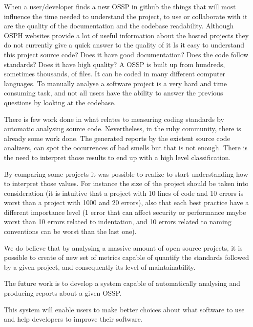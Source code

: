 \documentclass[sle]{llncs}
\begin{document}
When a user/developer finds a new OSSP in github 
the things that will most influence the time needed to understand the project, to use or collaborate with it
are the quality of the documentation and the codebase readability.  
Although OSPH websites provide a lot of useful information about the hosted projects
they do not currently give a quick answer to the quality of it
Is it easy to understand this project source code? Does it have good documentation? Does the code follow standards? 
Does it have high quality?
A OSSP is built up from hundreds, sometimes thousands, of files. It can be coded in many different computer languages.
To manually analyse a software project is a very hard and time consuming task, and not all users have the ability to answer the previous questions by looking at the codebase. 

There is few work done in what relates to measuring coding standards by automatic analysing source code.
Nevertheless, in the ruby community, there is already some work done.
The generated reports by the existent source code analizers, 
can spot the occurrences of bad smells but that is not enough.
There is the need to interpret those results to end up with a high level classification.

By comparing some projects it was possible to realize to start understanding how to interpret those values.
For instance the size of the project should be taken into consideration 
(it is intuitive that a project with 10 lines of code and 10 errors is worst than a project with 1000 and 20 errors), 
also that each best practice have a different importance level
(1 error that can affect security or performance maybe worst than 10 errors related to indentation, and 10 errors related to naming conventions can be worst than the last one).

We do believe that by analysing a massive amount of open source projects,
it is possible to create of new set of metrics capable of quantify the standards followed by a given project, 
and consequently its level of maintainability.

The future work is to develop a system capable of automatically analysing and producing reports about a given OSSP.

This system will enable users to make better choices about what software to use and help developers to improve their software.





\end{document}
